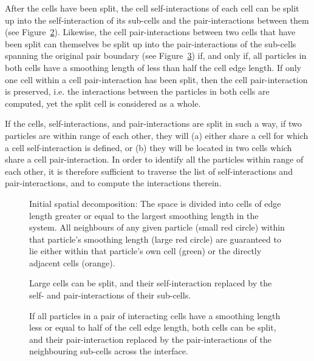 \documentclass[final]{siamltex}
\newcommand{\fig}[1]
    {Figure~\ref{fig:#1}}
\begin{document}
After the cells have been split, the cell self-interactions
of each cell can be split up into the self-interaction
of its sub-cells and the pair-interactions between
them (see \fig{SplitCell}).
Likewise, the cell pair-interactions between two cells
that have been split can themselves be split up into
the pair-interactions of the sub-cells spanning the
original pair boundary (see \fig{SplitPair}) if, and only if,
all particles in both cells have a smoothing length of
less than half the cell edge length.
If only one cell within a cell pair-interaction has been
split, then the cell pair-interaction is preserved, i.e. the
interactions between the particles in both cells are computed,
yet the split cell is considered as a whole.

If the cells, self-interactions, and pair-interactions are split
in such a way, if two particles are within range of each other,
they will (a) either share a cell for which a cell self-interaction
is defined, or (b) they will be located in two cells which share
a cell pair-interaction.
In order to identify all the particles within range of each other,
it is therefore sufficient to traverse the list of
self-interactions and pair-interactions, and to compute the
interactions therein.


\begin{figure}
    \centerline{}
    
    \caption{Initial spatial decomposition: The space is divided into cells of
        edge length greater or equal to the largest smoothing length in the
        system. All neighbours of any given particle (small red circle) within
        that particle's smoothing length (large red circle) are guaranteed to lie
        either within that particle's own cell (green) or the directly
        adjacent cells (orange).}
    \label{fig:InitialDecomp}
\end{figure}


\begin{figure}
    \centerline{}
    
    \caption{Large cells can be split, and their
        self-interaction replaced by the self- and pair-interactions
        of their sub-cells.}
    \label{fig:SplitCell}
\end{figure}


\begin{figure}
    \centerline{}
    
    \caption{If all particles in a pair of interacting cells have a smoothing
        length less or equal to half of the cell edge length, both cells can be
        split, and their pair-interaction replaced by the pair-interactions
        of the neighbouring sub-cells across the interface.}
    \label{fig:SplitPair}
\end{figure}
\end{document}
